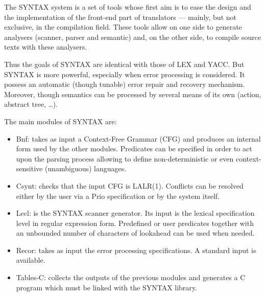 \documentclass[11pt]{article}
\begin{document}
The SYNTAX system is a set of tools whose first aim is to ease the design and
the implementation of the front-end part of translators --- mainly, but not
exclusive, in the compilation field.  These tools allow on one side to generate
analysers (scanner, parser and semantic) and, on the other side, to compile
source texts with these analysers.

Thus the goals of SYNTAX are identical with those of LEX and YACC.  But SYNTAX
is more powerful, especially when error processing is considered.  It possess
an automatic (though tunable) error repair and recovery mechanism.  Moreover,
though semantics can be processed by several means of its own (action, abstract
tree, \ldots{}).

The main modules of SYNTAX are:

\begin{itemize}
\item {\sc Bnf}: takes as input a Context-Free Grammar (CFG) and produces an internal
      form used by the other modules.  Predicates can be specified in order to
      act upon the parsing process allowing to define non-deterministic or even
      context-sensitive (unambiguous) languages.

\item {\sc Csynt}: checks that the input CFG is LALR(1).  Conflicts can
      be resolved either by the user via a {\sc Prio} specification or by the
      system itself.

\item {\sc Lecl}: is the SYNTAX scanner generator.  Its input is the lexical
      specification level in regular expression form.  Predefined or user
      predicates together with an unbounded number of characters of lookahead
      can be used when needed.

\item {\sc Recor}: takes as input the error processing specifications.  A
      standard input is available.

\item {\sc Tables-C}: collects the outputs of the previous modules and
      generates a C program which must be linked with the SYNTAX library.

\end{itemize}

\end{document}
